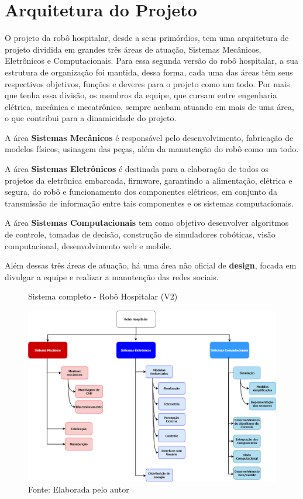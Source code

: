 \documentclass[../poliXuniversity_hospital_-USP-report.tex]{subfiles}
\begin{document}
\chapter{Arquitetura do Projeto}

O projeto da  robô hospitalar, desde a seus primórdios, tem uma arquitetura de projeto dividida em grandes três áreas de atuação, Sistemas Mecânicos, Eletrônicos e Computacionais. Para essa segunda versão do robô hospitalar, a sua estrutura de organização foi mantida, dessa forma, cada uma das áreas têm seus respectivos objetivos, funções e deveres para o projeto como um todo. Por mais que tenha essa divisão, os membros da equipe, que cursam entre engenharia elétrica, mecânica e mecatrônico, sempre acabam atuando em mais de uma área, o que contribui para a dinamicidade do projeto.

A área \textbf{Sistemas Mecânicos} é responsável pelo desenvolvimento, fabricação de modelos físicos, usinagem das peças, além da manutenção do robô como um todo. 

A área \textbf{Sistemas Eletrônicos} é destinada para a elaboração de todos os projetos da eletrônica embarcada, firmware, garantindo a alimentação, elétrica e segura, do robô e funcionamento dos componentes elétricos, em conjunto da transmissão de informação entre tais componentes e os sistemas computacionais.

A área \textbf{Sistemas Computacionais} tem como objetivo desenvolver algoritmos de controle, tomadas de decisão, construção de simuladores robóticas, visão computacional, desenvolvimento web e mobile.

Além dessas três áreas de atuação, há uma área não oficial de \textbf{design}, focada em divulgar a equipe e realizar a manutenção das redes sociais. \cite{site_robo_hospitalar21}

\begin{figure}[h]
\centering
    \caption{Sistema completo - Robô Hospitalar (V2)}
    \centering %
    \includegraphics[width=17cm]{sistema_robo.png}
    \caption*{Fonte: Elaborada pelo autor}
    \label{figura:1° Versão Robô Hospitalar}
\end{figure}
\end{document}
